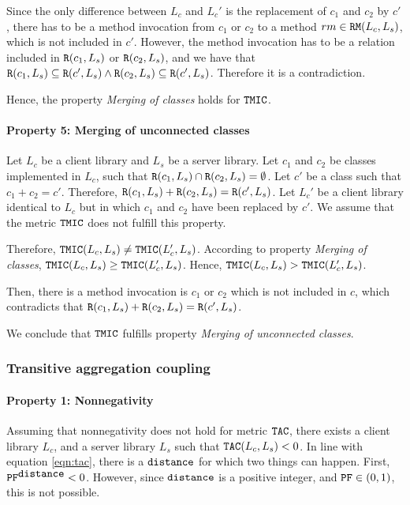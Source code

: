 Since the only difference between $L_c$ and $L_c'$ is the replacement of $c_1$ and $c_2$ by $c'$, there has to be a method invocation from $c_1$ or $c_2$ to a method $rm \in \verb|RM|(L_c,L_s)$, which is not included in $c'$. However, the method invocation has to be a relation included in $\verb|R|(c_1, L_s)$ or $\verb|R|(c_2, L_s)$, and we have that $\verb|R|(c_1, L_s) \subseteq \verb|R|(c', L_s) \land \verb|R|(c_2, L_s) \subseteq \verb|R|(c', L_s)$. Therefore it is a contradiction.

Hence, the property \textit{Merging of classes} holds for $\verb|TMIC|$.

\paragraph{Property 5: Merging of unconnected classes}
Let $L_c$ be a client library and $L_s$ be a server library. Let $c_1$ and $c_2$ be classes implemented in $L_c$, such that $\verb|R|(c_1, L_s) \cap \verb|R|(c_2, L_s) = \emptyset$. Let $c'$ be a class such that $c_1 + c_2 = c'$. Therefore, $\verb|R|(c_1, L_s) + \verb|R|(c_2, L_s) = \verb|R|(c', L_s)$. Let $L_c'$ be a client library identical to $L_c$ but in which $c_1$ and $c_2$ have been replaced by $c'$. We assume that the metric $\verb|TMIC|$ does not fulfill this property.

Therefore, $\verb|TMIC|(L_c, L_s) \neq \verb|TMIC|(L_c', L_s)$. According to property \textit{Merging of classes}, $\verb|TMIC|(L_c, L_s) \geq \verb|TMIC|(L_c', L_s)$. Hence, $\verb|TMIC|(L_c, L_s) > \verb|TMIC|(L_c', L_s)$.

Then, there is a method invocation is $c_1$ or $c_2$ which is not included in $c$, which contradicts that $\verb|R|(c_1, L_s) + \verb|R|(c_2, L_s) = \verb|R|(c', L_s)$.

We conclude that $\verb|TMIC|$ fulfills property \textit{Merging of unconnected classes}.

\subsubsection{Transitive aggregation coupling}

\paragraph{Property 1: Nonnegativity}
Assuming that nonnegativity does not hold for metric $\verb|TAC|$, there exists a client library $L_c$, and a server library $L_s$ such that $\verb|TAC|(L_c, L_s) < 0$. In line with equation \ref{eqn:tac}, there is a $\verb|distance|$ for which two things can happen. First, $\verb|PF|^{\verb|distance|} < 0$. However, since $\verb|distance|$ is a positive integer, and $\verb|PF| \in (0,1)$, this is not possible.

